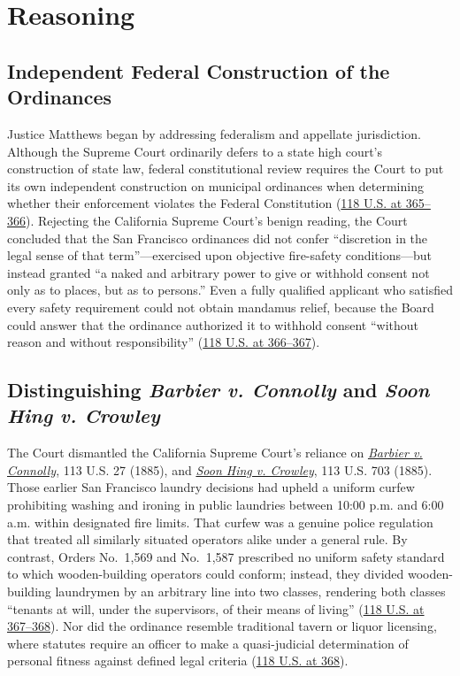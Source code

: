 \documentclass[12pt]{article}
\begin{document}
\section{Reasoning}

\subsection{Independent Federal Construction of the Ordinances}
Justice Matthews began by addressing federalism and appellate jurisdiction. Although the Supreme Court ordinarily defers to a state high court's construction of state law, federal constitutional review requires the Court to put its own independent construction on municipal ordinances when determining whether their enforcement violates the Federal Constitution (\href{https://supreme.justia.com/cases/federal/us/118/356/}{118 U.S. at 365--366}). Rejecting the California Supreme Court's benign reading, the Court concluded that the San Francisco ordinances did not confer ``discretion in the legal sense of that term''---exercised upon objective fire-safety conditions---but instead granted ``a naked and arbitrary power to give or withhold consent not only as to places, but as to persons.'' Even a fully qualified applicant who satisfied every safety requirement could not obtain mandamus relief, because the Board could answer that the ordinance authorized it to withhold consent ``without reason and without responsibility'' (\href{https://supreme.justia.com/cases/federal/us/118/356/}{118 U.S. at 366--367}).

\subsection{Distinguishing \emph{Barbier v. Connolly} and \emph{Soon Hing v. Crowley}}
The Court dismantled the California Supreme Court's reliance on \href{https://supreme.justia.com/cases/federal/us/113/27/}{\emph{Barbier v. Connolly}}, 113 U.S. 27 (1885), and \href{https://supreme.justia.com/cases/federal/us/113/703/}{\emph{Soon Hing v. Crowley}}, 113 U.S. 703 (1885). Those earlier San Francisco laundry decisions had upheld a uniform curfew prohibiting washing and ironing in public laundries between 10:00 p.m. and 6:00 a.m. within designated fire limits. That curfew was a genuine police regulation that treated all similarly situated operators alike under a general rule. By contrast, Orders No.~1,569 and No.~1,587 prescribed no uniform safety standard to which wooden-building operators could conform; instead, they divided wooden-building laundrymen by an arbitrary line into two classes, rendering both classes ``tenants at will, under the supervisors, of their means of living'' (\href{https://supreme.justia.com/cases/federal/us/118/356/}{118 U.S. at 367--368}). Nor did the ordinance resemble traditional tavern or liquor licensing, where statutes require an officer to make a quasi-judicial determination of personal fitness against defined legal criteria (\href{https://supreme.justia.com/cases/federal/us/118/356/}{118 U.S. at 368}).
\end{document}
